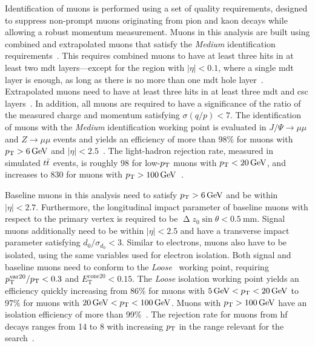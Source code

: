 Identification of muons is performed using a set of quality requirements, designed to suppress non-prompt muons originating from pion and kaon decays while allowing a robust momentum measurement.
Muons in this analysis are built using combined and extrapolated muons that satisfy the \textit{Medium} identification requirements~\cite{PERF-2015-10}.
This requires combined muons to have at least three hits in at least two \gls{mdt} layers---except for the region with $\vert\eta\vert < 0.1$, where a single \gls{mdt} layer is enough, as long as there is no more than one \gls{mdt} hole layer~\cite{Aad:2020gmm}.
Extrapolated muons need to have at least three hits in at least three \gls{mdt} and \gls{csc} layers~\cite{Aad:2020gmm}.
In addition, all muons are required to have a significance of the ratio of the measured charge and momentum satisfying $\sigma(q/p) < 7$.
The identification of muons with the \textit{Medium} identification working point is evaluated in $J/\Psi\rightarrow\mu\mu$ and $Z\rightarrow\mu\mu$ events and yields an efficiency of more than 98\% for muons with $\pt > \SI{6}{\GeV}$ and $\vert\eta\vert < 2.5$~\cite{Aad:2020gmm}.
The light-hadron rejection rate, measured in simulated $t\bar{t}$ events, is roughly 98 for low-$p_{\mathrm{T}}$ muons with $\pt < \SI{20}{\GeV}$, and increases to 830 for muons with $\pt > \SI{100}{\GeV}$~\cite{Aad:2020gmm}.

Baseline muons in this analysis need to satisfy $\pt > \SI{6}{\GeV}$ and be within $\vert\eta\vert < 2.7$. Furthermore, the longitudinal impact parameter of baseline muons with respect to the primary vertex is required to be $\upDelta z_0\sin\theta < \SI{0.5}{\milli\meter}$.
Signal muons additionally need to be within $\vert\eta\vert < 2.5$ and have a transverse impact parameter satisfying $d_0/\sigma_{d_0} < 3$. Similar to electrons, muons also have to be isolated, using the same variables used for electron isolation.
Both signal and baseline muons need to conform to the \textit{Loose}~\cite{Aad:2020gmm} working point, requiring $p_{\mathrm{T}}^{\mathrm{var20}}/p_{\mathrm{T}} < 0.3$ and $E_{\mathrm{T}}^{\mathrm{cone20}} < 0.15$.
The \textit{Loose} isolation working point yields an efficiency quickly increasing from 86\% for muons with $\SI{5}{\GeV} < \pt < \SI{20}{\GeV}$ to 97\% for muons with $\SI{20}{\GeV} < \pt < \SI{100}{\GeV}$.
Muons with $\pt > \SI{100}{\GeV}$ have an isolation efficiency of more than 99\%~\cite{Aad:2020gmm}. The rejection rate for muons from \gls{hf} decays ranges from 14 to 8 with increasing $p_{\mathrm{T}}$ in the range relevant for the \onelepton search~\cite{Aad:2020gmm}.

